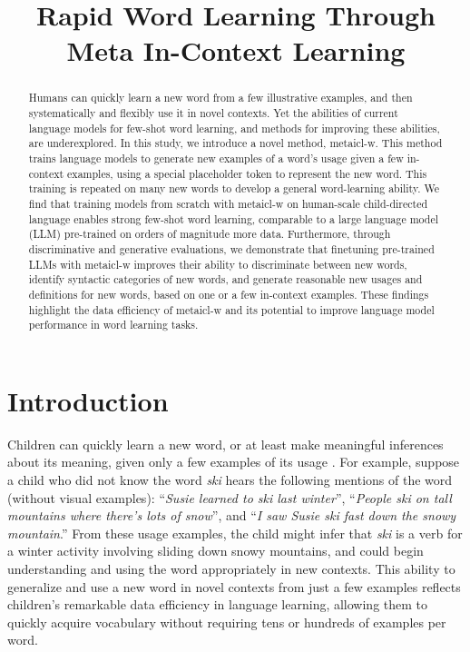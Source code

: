 \documentclass{article}
\title{Rapid Word Learning Through Meta In-Context Learning}
\begin{document}
\maketitle

\begin{abstract}
Humans can quickly learn a new word from a few illustrative examples, and then systematically and flexibly use it in novel contexts.
Yet the abilities of current language models for few-shot word learning, and methods for improving these abilities, are underexplored.
In this study, we introduce a novel method, \ac{metaicl-w}.
This method trains language models to generate new examples of a word's usage given a few in-context examples, using a special placeholder token to represent the new word.
This training is repeated on many new words to develop a general word-learning ability.
We find that training models from scratch with \ac{metaicl-w} on human-scale child-directed language enables strong few-shot word learning, comparable to a large language model (LLM) pre-trained on orders of magnitude more data.
Furthermore, through discriminative and generative evaluations, we demonstrate that finetuning pre-trained LLMs with \ac{metaicl-w} improves their ability to discriminate between new words, identify syntactic categories of new words, and generate reasonable new usages and definitions for new words, based on one or a few in-context examples.
These findings highlight the data efficiency of \ac{metaicl-w} and its potential to improve language model performance in word learning tasks.
\end{abstract}


\section{Introduction}
\label{sec:intro}

Children can quickly learn a new word, or at least make meaningful inferences about its meaning, given only a few examples of its usage \citep{CareyBartlett1978,Bloom2000}.
For example, suppose a child who did not know the word \emph{ski} hears the following mentions of the word (without visual examples): ``\emph{Susie learned to ski last winter}'', ``\emph{People ski on tall mountains where there's lots of snow}'', and ``\emph{I saw Susie ski fast down the snowy mountain}.''
From these usage examples, the child might infer that \emph{ski} is a verb for a winter activity involving sliding down snowy mountains, and could begin understanding and using the word appropriately in new contexts.
This ability to generalize and use a new word in novel contexts from just a few examples reflects children's remarkable data efficiency in language learning, allowing them to quickly acquire vocabulary without requiring tens or hundreds of examples per word.
\end{document}

